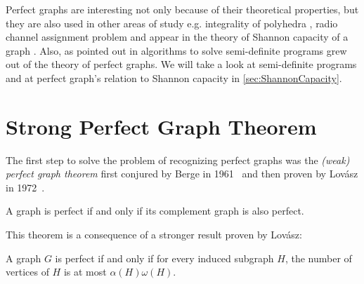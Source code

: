 Perfect graphs are interesting not only because of their theoretical properties, but they are also used in other areas of study e.g. integrality of polyhedra \cite{Chvtal1975, Chudnovsky2003}, radio channel assignment problem \cite{McDiarmid99, McDiarmid2000} and appear in the theory of Shannon capacity of a graph \cite{Lovasz1979}. Also, as pointed out in \cite{alfonsinPerfect2001, Chudnovsky2003} algorithms to solve semi-definite programs grew out of the theory of perfect graphs. We will take a look at semi-definite programs and at perfect graph's relation to Shannon capacity in \cref{sec:ShannonCapacity}.

\section{Strong Perfect Graph Theorem}
\label{sec:SPGT}

The first step to solve the problem of recognizing perfect graphs was the \emph{(weak) perfect graph theorem} first conjured by Berge in 1961~\cite{CB61} and then proven by Lovász in 1972~\cite{LL72}.

\begin{theorem}
	\label{thm:pgt}
	A graph is perfect if and only if its complement graph is also perfect.
\end{theorem}

This theorem is a consequence of a stronger result proven by Lovász:
\begin{theorem}
	\label{thm:omegaalpha}
	A graph $G$ is perfect if and only if for every induced subgraph $H$, the number of vertices of $H$ is at most $\alpha(H)\omega(H)$.
\end{theorem}



